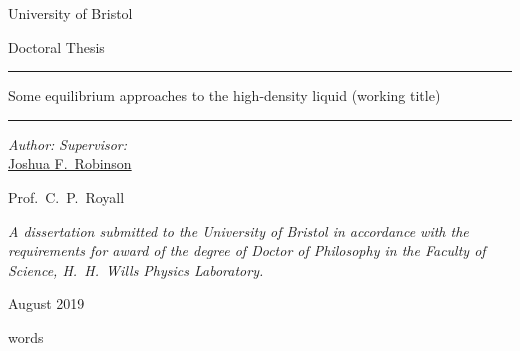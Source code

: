 \documentclass[11pt,twoside]{report}
\DeclareRobustCommand{\wordcount}{}
\begin{document}

\thispagestyle{empty}
\begin{center}
  \begin{minipage}{0.8\linewidth}
    \centering
    \vspace{3cm}
    {\Large \sc University of Bristol \par}
    \vspace{2cm}
    {\Large \sc Doctoral Thesis \par}
    \vspace{1cm}
    \rule{\textwidth}{0.4pt} \par
    {\LARGE \sc \color{bristolred} Some equilibrium approaches to the high-density liquid (working title) \par}
    \rule{\textwidth}{0.4pt} \par
    \vspace{2cm}
    {\large \it Author:}
    \hfill
    {\large \it Supervisor:} \\
    {\sc \large \href{mailto:joshua.robinson@bristol.ac.uk}{Joshua F.\ Robinson}}
    \hfill
    {\sc \large Prof.\ C.\ P.\ Royall \par}
    \vspace{3.5cm}
   {\large \it A dissertation submitted to the University of Bristol in accordance with the requirements for award of the degree of Doctor of Philosophy in the Faculty of Science, H.\ H.\ Wills Physics Laboratory. \par}
    \vspace{1em}
    {\large August 2019 \par}
  \end{minipage}
  \mbox{}
  \vfill
  \begin{minipage}{0.8\linewidth}
    \raggedleft
    {\large \wordcount words}
  \end{minipage}
\end{center}

\cleardoublepage
\cleardoublepage
\cleardoublepage
\cleardoublepage
\cleardoublepage

\cleardoublepage\tableofcontents
\cleardoublepage\listoffigures
\cleardoublepage\listoftodos

\restoregeometry

\setcounter{page}{1}








\begin{appendices}
  
  
\end{appendices}

\printbibliography[heading=bibintoc]
\end{document}
